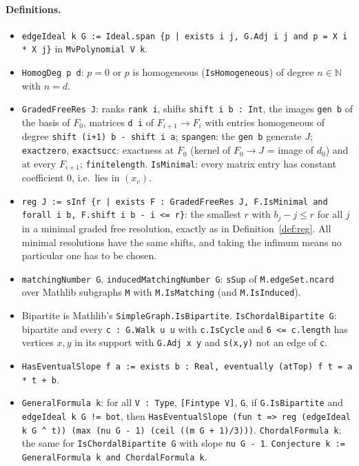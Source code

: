 \documentclass[11pt]{article}
\theoremstyle{definition}
\theoremstyle{remark}
\renewcommand{\_}{\oldus\allowbreak}
\begin{document}
\paragraph{Definitions.}
\begin{itemize}[leftmargin=*]
  \item \texttt{edgeIdeal k G := Ideal.span \{p | exists i j, G.Adj i j and p = X i * X j\}} in
        \texttt{MvPolynomial V k}.
  \item \texttt{HomogDeg p d}: $p = 0$ or $p$ is homogeneous (\texttt{IsHomogeneous}) of degree
        $n \in \mathbb{N}$ with $n = d$.
  \item \texttt{GradedFreeRes J}: ranks \texttt{rank i}, shifts \texttt{shift i b : Int}, the images
        \texttt{gen b} of the basis of $F_0$, matrices \texttt{d i} of $F_{i+1} \to F_i$ with entries
        homogeneous of degree \texttt{shift (i+1) b - shift i a}; \texttt{span\_gen}: the \texttt{gen b}
        generate $J$; \texttt{exact\_zero}, \texttt{exact\_succ}: exactness at $F_0$ (kernel of
        $F_0 \to J$ = image of $d_0$) and at every $F_{i+1}$; \texttt{finite\_length}.
        \texttt{IsMinimal}: every matrix entry has constant coefficient $0$, i.e.\ lies in $(x_v)$.
  \item \texttt{reg J := sInf \{r | exists F : GradedFreeRes J, F.IsMinimal and forall i b,
        F.shift i b - i <= r\}}: the smallest $r$ with $b_j - j \le r$ for all $j$ in a minimal graded
        free resolution, exactly as in Definition~\ref{def:reg}. All minimal resolutions have the same shifts,
        and taking the infimum means no particular one has to be chosen.
  \item \texttt{matchingNumber G}, \texttt{inducedMatchingNumber G}: \texttt{sSup} of
        \texttt{M.edgeSet.ncard} over Mathlib subgraphs \texttt{M} with \texttt{M.IsMatching} (and
        \texttt{M.IsInduced}).
  \item Bipartite is Mathlib's \texttt{SimpleGraph.IsBipartite}. \texttt{IsChordalBipartite G}: bipartite and every
        \texttt{c : G.Walk u u} with \texttt{c.IsCycle} and \texttt{6 <= c.length} has vertices
        $x,y$ in its support with \texttt{G.Adj x y} and \texttt{s(x,y)} not an edge of \texttt{c}.
  \item \texttt{HasEventualSlope f a := exists b : Real, eventually (atTop) f t = a * t + b}.
  \item \texttt{GeneralFormula k}: for all \texttt{V : Type}, \texttt{[Fintype V]}, \texttt{G}, if
        \texttt{G.IsBipartite} and \texttt{edgeIdeal k G != bot}, then
        \texttt{HasEventualSlope (fun t => reg (edgeIdeal k G \^{} t))
        (max (nu G - 1) (ceil ((m G + 1)/3)))}. \texttt{ChordalFormula k}: the same for
        \texttt{IsChordalBipartite G} with slope \texttt{nu G - 1}.
        \texttt{Conjecture k := GeneralFormula k and ChordalFormula k}.
\end{itemize}
\end{document}

